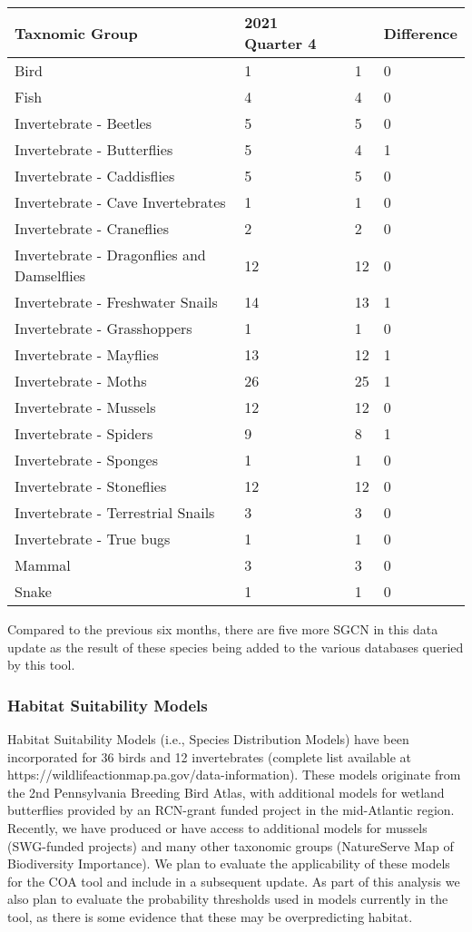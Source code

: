 \documentclass{article}\usepackage[]{graphicx}\usepackage[table]{xcolor}
\begin{document}
\begin{longtable}{p{2.5in}C{1in}C{1in}C{1in}}
\label{tab:missingSGCN}\\
\hline
\textbf{Taxnomic Group} & \textbf{2021 Quarter 4} & \textbf{} & \textbf{Difference} \\
\midrule
\endhead
Bird & 1 & 1 & 0 \\Fish & 4 & 4 & 0 \\Invertebrate - Beetles & 5 & 5 & 0 \\Invertebrate - Butterflies & 5 & 4 & 1 \\Invertebrate - Caddisflies & 5 & 5 & 0 \\Invertebrate - Cave Invertebrates & 1 & 1 & 0 \\Invertebrate - Craneflies & 2 & 2 & 0 \\Invertebrate - Dragonflies and Damselflies & 12 & 12 & 0 \\Invertebrate - Freshwater Snails & 14 & 13 & 1 \\Invertebrate - Grasshoppers & 1 & 1 & 0 \\Invertebrate - Mayflies & 13 & 12 & 1 \\Invertebrate - Moths & 26 & 25 & 1 \\Invertebrate - Mussels & 12 & 12 & 0 \\Invertebrate - Spiders & 9 & 8 & 1 \\Invertebrate - Sponges & 1 & 1 & 0 \\Invertebrate - Stoneflies & 12 & 12 & 0 \\Invertebrate - Terrestrial Snails & 3 & 3 & 0 \\Invertebrate - True bugs & 1 & 1 & 0 \\Mammal & 3 & 3 & 0 \\Snake & 1 & 1 & 0 \\
\hline
\end{longtable}

\noindent 
Compared to the previous six months, there are five more SGCN in this data update as the result of these species being added to the various databases queried by this tool.
\subsubsection*{Habitat Suitability Models}
\noindent Habitat Suitability Models (i.e., Species Distribution Models) have been incorporated for 36 birds and 12 invertebrates (complete list available at https://wildlifeactionmap.pa.gov/data-information). These models originate from the 2nd Pennsylvania Breeding Bird Atlas, with additional models for wetland butterflies provided by an RCN-grant funded project in the mid-Atlantic region. Recently, we have produced or have access to additional models for mussels (SWG-funded projects) and many other taxonomic groups (NatureServe Map of Biodiversity Importance). We plan to evaluate the applicability of these models for the COA tool and include in a subsequent update. As part of this analysis we also plan to evaluate the probability thresholds used in models currently in the tool, as there is some evidence that these may be overpredicting habitat. 
\end{document}
